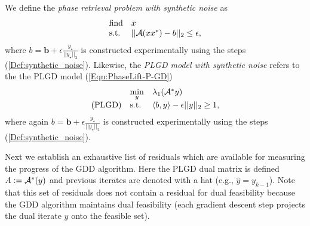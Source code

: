 We define the \textit{phase retrieval problem with synthetic noise} as
\begin{equation} \label{Eqn:phase_retrieval_synthetic_noise}
\begin{array}{ll}
		\text{find}
		&	x
			\\
		\textnormal{s.t.}
		& 	||{\mathcal A} (xx^*) - b||_2 \leq \epsilon,
\end{array}
\end{equation}
where $b = \mathbf{b} + \epsilon \frac{y_\star}{|| y_\star ||_2}$ is constructed experimentally using the steps (\ref{Def:synthetic_noise}).  Likewise, the \textit{PLGD model with synthetic noise} refers to the the PLGD model (\ref{Eqn:PhaseLift-P-GD}) 
\begin{equation} 			\label{Eqn:PhaseLift-GD_synthetic_noise}
\begin{array}{lll}
	&\min\limits_{\substack{y}}
					&	\lambda_1({\mathcal A}^* y)
						\\
	\textnormal{(PLGD)}
				&	\textnormal{s.t.}
					&	\langle b, y \rangle - \epsilon ||y||_2 \geq 1,
\end{array}
\end{equation}
where again $b = \mathbf{b} + \epsilon \frac{y_\star}{|| y_\star ||_2}$ is constructed experimentally using the steps (\ref{Def:synthetic_noise}).  











Next we establish an exhaustive list of residuals which are available for measuring the progress of the GDD algorithm.  Here the PLGD dual matrix is defined $A:= {\mathcal A}^*(y)$ and previous iterates are denoted with a hat (e.g., $ \hat{y} = y_{k-1} $).  Note that this set of residuals does not contain a residual for dual feasibility because the GDD algorithm maintains dual feasibility (each gradient descent step projects the dual iterate $y$ onto the feasible set).

